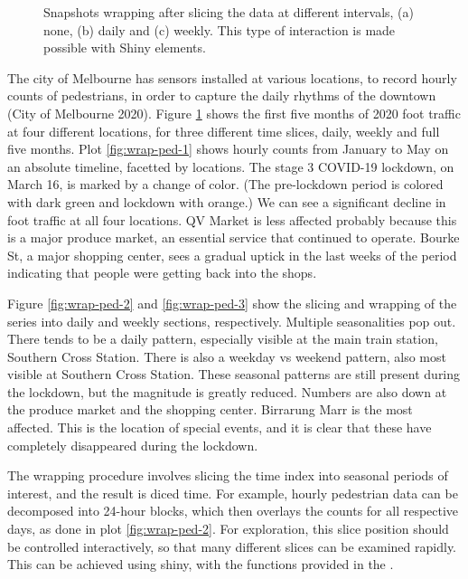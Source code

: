 \begin{figure}
{}

\caption{Snapshots wrapping after slicing the  data at different intervals, (a) none, (b) daily and (c) weekly. This type of interaction is made possible with Shiny elements.}\label{fig:wrap-ped}
\end{figure}

The city of Melbourne has sensors installed at various locations, to record hourly counts of pedestrians, in order to capture the daily rhythms of the downtown (City of Melbourne 2020). Figure \ref{fig:wrap-ped} shows the first five months of 2020 foot traffic at four different locations, for three different time slices, daily, weekly and full five months. Plot \ref{fig:wrap-ped-1} shows hourly counts from January to May on an absolute timeline, facetted by locations. The stage 3 COVID-19 lockdown, on March 16, is marked by a change of color. (The pre-lockdown period is colored with dark green and lockdown with orange.) We can see a significant decline in foot traffic at all four locations. QV Market is less affected probably because this is a major produce market, an essential service that continued to operate. Bourke St, a major shopping center, sees a gradual uptick in the last weeks of the period indicating that people were getting back into the shops.

Figure \ref{fig:wrap-ped-2} and \ref{fig:wrap-ped-3} show the slicing and wrapping of the series into daily and weekly sections, respectively. Multiple seasonalities pop out. There tends to be a daily pattern, especially visible at the main train station, Southern Cross Station. There is also a weekday vs weekend pattern, also most visible at Southern Cross Station. These seasonal patterns are still present during the lockdown, but the magnitude is greatly reduced. Numbers are also down at the produce market and the shopping center. Birrarung Marr is the most affected. This is the location of special events, and it is clear that these have completely disappeared during the lockdown.

The wrapping procedure involves slicing the time index into seasonal periods of interest, and the result is diced time. For example, hourly pedestrian data can be decomposed into 24-hour blocks, which then overlays the counts for all respective days, as done in plot \ref{fig:wrap-ped-2}. For exploration, this slice position should be controlled interactively, so that many different slices can be examined rapidly. This can be achieved using shiny, with the functions provided in the .

